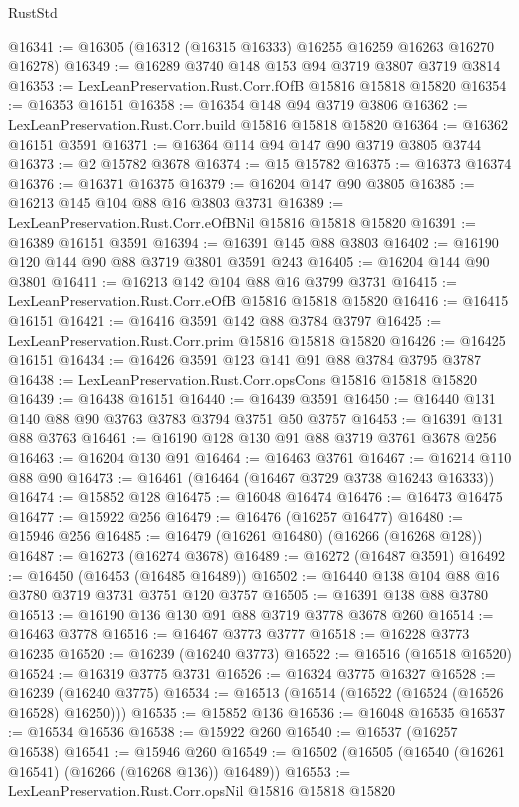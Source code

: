 \begin{lexlean}{RustStd}
\begin{coremodule}
@16341 := @16305 (@16312 (@16315 @16333) @16255 @16259 @16263 @16270 @16278)
@16349 := @16289 @3740 @148 @153 @94 @3719 @3807 @3719 @3814
@16353 := LexLeanPreservation.Rust.Corr.fOfB @15816 @15818 @15820
@16354 := @16353 @16151
@16358 := @16354 @148 @94 @3719 @3806
@16362 := LexLeanPreservation.Rust.Corr.build @15816 @15818 @15820
@16364 := @16362 @16151 @3591
@16371 := @16364 @114 @94 @147 @90 @3719 @3805 @3744
@16373 := @2 @15782 @3678
@16374 := @15 @15782
@16375 := @16373 @16374
@16376 := @16371 @16375
@16379 := @16204 @147 @90 @3805
@16385 := @16213 @145 @104 @88 @16 @3803 @3731
@16389 := LexLeanPreservation.Rust.Corr.eOfBNil @15816 @15818 @15820
@16391 := @16389 @16151 @3591
@16394 := @16391 @145 @88 @3803
@16402 := @16190 @120 @144 @90 @88 @3719 @3801 @3591 @243
@16405 := @16204 @144 @90 @3801
@16411 := @16213 @142 @104 @88 @16 @3799 @3731
@16415 := LexLeanPreservation.Rust.Corr.eOfB @15816 @15818 @15820
@16416 := @16415 @16151
@16421 := @16416 @3591 @142 @88 @3784 @3797
@16425 := LexLeanPreservation.Rust.Corr.prim @15816 @15818 @15820
@16426 := @16425 @16151
@16434 := @16426 @3591 @123 @141 @91 @88 @3784 @3795 @3787
@16438 := LexLeanPreservation.Rust.Corr.opsCons @15816 @15818 @15820
@16439 := @16438 @16151
@16440 := @16439 @3591
@16450 := @16440 @131 @140 @88 @90 @3763 @3783 @3794 @3751 @50 @3757
@16453 := @16391 @131 @88 @3763
@16461 := @16190 @128 @130 @91 @88 @3719 @3761 @3678 @256
@16463 := @16204 @130 @91
@16464 := @16463 @3761
@16467 := @16214 @110 @88 @90
@16473 := @16461 (@16464 (@16467 @3729 @3738 @16243 @16333))
@16474 := @15852 @128
@16475 := @16048 @16474
@16476 := @16473 @16475
@16477 := @15922 @256
@16479 := @16476 (@16257 @16477)
@16480 := @15946 @256
@16485 := @16479 (@16261 @16480) (@16266 (@16268 @128))
@16487 := @16273 (@16274 @3678)
@16489 := @16272 (@16487 @3591)
@16492 := @16450 (@16453 (@16485 @16489))
@16502 := @16440 @138 @104 @88 @16 @3780 @3719 @3731 @3751 @120 @3757
@16505 := @16391 @138 @88 @3780
@16513 := @16190 @136 @130 @91 @88 @3719 @3778 @3678 @260
@16514 := @16463 @3778
@16516 := @16467 @3773 @3777
@16518 := @16228 @3773 @16235
@16520 := @16239 (@16240 @3773)
@16522 := @16516 (@16518 @16520)
@16524 := @16319 @3775 @3731
@16526 := @16324 @3775 @16327
@16528 := @16239 (@16240 @3775)
@16534 := @16513 (@16514 (@16522 (@16524 (@16526 @16528) @16250)))
@16535 := @15852 @136
@16536 := @16048 @16535
@16537 := @16534 @16536
@16538 := @15922 @260
@16540 := @16537 (@16257 @16538)
@16541 := @15946 @260
@16549 := @16502 (@16505 (@16540 (@16261 @16541) (@16266 (@16268 @136)) @16489))
@16553 := LexLeanPreservation.Rust.Corr.opsNil @15816 @15818 @15820

\end{coremodule}
\end{lexlean}
